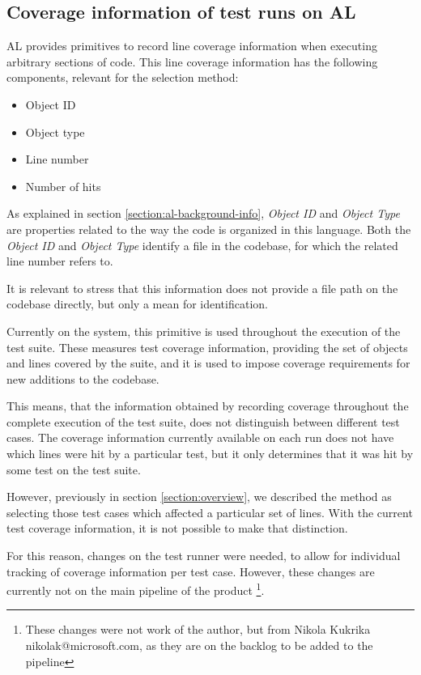 \documentclass{article}
\begin{document}
\subsection{Coverage information of test runs on AL}\label{section:cov-info}
AL provides primitives to record line coverage information when executing arbitrary sections of code. This line coverage information has the following components, relevant for the selection method:
\begin{itemize}
\item Object ID
\item Object type
\item Line number
\item Number of hits
\end{itemize}

As explained in section \ref{section:al-background-info}, \emph{Object ID} and \emph{Object Type} are properties related to the way the code is organized in this language. Both the \emph{Object ID} and \emph{Object Type} identify a file in the codebase, for which the related line number refers to.

It is relevant to stress that this information does not provide a file path on the codebase directly, but only a mean for identification.

Currently on the system, this primitive is used throughout the execution of the test suite. These measures test coverage information, providing the set of objects and lines covered by the suite, and it is used to impose coverage requirements for new additions to the codebase.

This means, that the information obtained by recording coverage throughout the complete execution of the test suite, does not distinguish between different test cases. The coverage information currently available on each run does not have which lines were hit by a particular test, but it only determines that it was hit by some test on the test suite.

However, previously in section \ref{section:overview}, we described the method as selecting those test cases which affected a particular set of lines. With the current test coverage information, it is not possible to make that distinction.

For this reason, changes on the test runner were needed, to allow for individual tracking of coverage information per test case. However, these changes are currently not on the main pipeline of the product \footnote{These changes were not work of the author, but from Nikola Kukrika nikolak@microsoft.com, as they are on the backlog to be added to the pipeline}.
\end{document}
